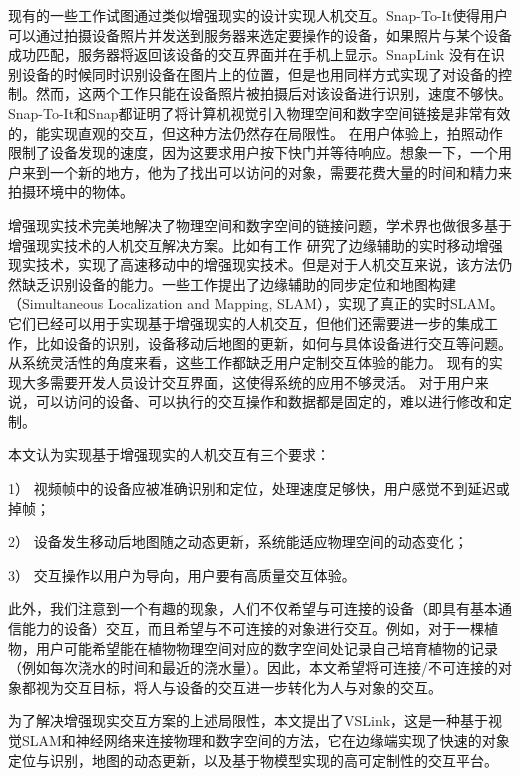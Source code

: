 现有的一些工作试图通过类似增强现实的设计实现人机交互\cite{de2016snap,chen2018snaplink}。Snap-To-It\cite{de2016snap}使得用户可以通过拍摄设备照片并发送到服务器来选定要操作的设备，如果照片与某个设备成功匹配，服务器将返回该设备的交互界面并在手机上显示。SnapLink\cite{chen2018snaplink} 没有在识别设备的时候同时识别设备在图片上的位置，但是也用同样方式实现了对设备的控制。然而，这两个工作只能在设备照片被拍摄后对该设备进行识别，速度不够快。Snap-To-It和Snap都证明了将计算机视觉引入物理空间和数字空间链接是非常有效的，能实现直观的交互，但这种方法仍然存在局限性。
在用户体验上，拍照动作限制了设备发现的速度，因为这要求用户按下快门并等待响应。想象一下，一个用户来到一个新的地方，他为了找出可以访问的对象，需要花费大量的时间和精力来拍摄环境中的物体。

增强现实技术完美地解决了物理空间和数字空间的链接问题，学术界也做很多基于增强现实技术的人机交互解决方案。比如有工作\cite{liu2019edge} 研究了边缘辅助的实时移动增强现实技术，实现了高速移动中的增强现实技术。但是对于人机交互来说，该方法仍然缺乏识别设备的能力。一些工作\cite{ben2020edge,xu2020edge,liu2021edgesharing}提出了边缘辅助的同步定位和地图构建（Simultaneous Localization and Mapping, SLAM），实现了真正的实时SLAM。它们已经可以用于实现基于增强现实的人机交互，但他们还需要进一步的集成工作，比如设备的识别，设备移动后地图的更新，如何与具体设备进行交互等问题。
从系统灵活性的角度来看，这些工作都缺乏用户定制交互体验的能力。
现有的实现大多需要开发人员设计交互界面，这使得系统的应用不够灵活。
对于用户来说，可以访问的设备、可以执行的交互操作和数据都是固定的，难以进行修改和定制。

本文认为实现基于增强现实的人机交互有三个要求：

1） 视频帧中的设备应被准确识别和定位，处理速度足够快，用户感觉不到延迟或掉帧；

2） 设备发生移动后地图随之动态更新，系统能适应物理空间的动态变化；

3） 交互操作以用户为导向，用户要有高质量交互体验。

此外，我们注意到一个有趣的现象，人们不仅希望与可连接的设备（即具有基本通信能力的设备）交互，而且希望与不可连接的对象进行交互。例如，对于一棵植物，用户可能希望能在植物物理空间对应的数字空间处记录自己培育植物的记录（例如每次浇水的时间和最近的浇水量）。因此，本文希望将可连接/不可连接的对象都视为交互目标，将人与设备的交互进一步转化为人与对象的交互。

为了解决增强现实交互方案的上述局限性，本文提出了VSLink，这是一种基于视觉SLAM和神经网络来连接物理和数字空间的方法，它在边缘端实现了快速的对象定位与识别，地图的动态更新，以及基于物模型实现的高可定制性的交互平台。

